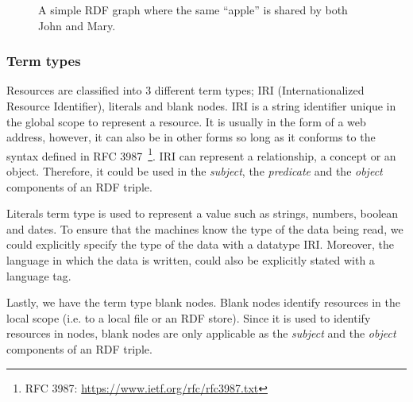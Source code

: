 \begin{figure}[htbp]
\centering
{}
\caption{A simple RDF graph where the same “apple” is shared by both John and Mary.}
\label{fig:rdf_graph_ex}
\end{figure}

\subsubsection*{Term types}
Resources are classified into 3 different term types; IRI (Internationalized Resource Identifier),
literals and blank nodes. IRI is a string identifier unique in the global scope to
represent a resource. It is usually in the form of a web address, however, it can
also be in other forms so long as it conforms to the syntax defined in
RFC 3987~\footnote{RFC 3987: \url{https://www.ietf.org/rfc/rfc3987.txt}}.
IRI can represent a relationship, a concept or an object. Therefore, it could be
used in the \textit{subject}, the \textit{predicate} and the \textit{object} components of
an RDF triple.

Literals term type is used to represent a value such as strings, numbers, boolean and dates.
To ensure that the machines know the type of the data being read, we could
explicitly specify the type of the data with a datatype IRI. Moreover, the
language in which the data is written, could also be explicitly stated with
a language tag.

Lastly, we have the term type blank nodes. Blank nodes identify resources
in the local scope (i.e. to a local file or an RDF store). Since it is used to
identify resources in nodes, blank nodes are only applicable as the \textit{subject}
and the \textit{object} components of an RDF triple.


